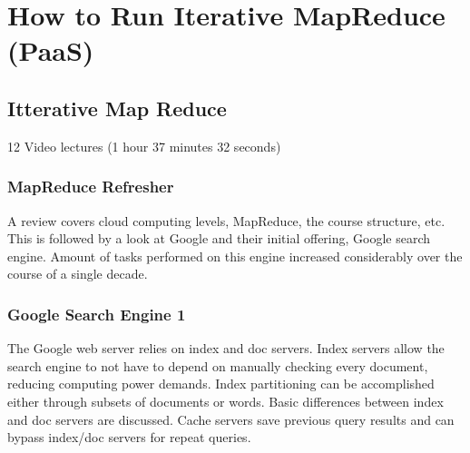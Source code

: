 \part{How to Run Iterative MapReduce (PaaS)}
\label{sec:icloud-iterative-mapreduce}



\chapter{Itterative Map Reduce}

\FILENAME

12 Video lectures (1 hour 37 minutes 32 seconds)

\section{MapReduce Refresher}

A review covers cloud computing levels, MapReduce, the course structure,
etc. This is followed by a look at Google and their initial offering,
Google search engine. Amount of tasks performed on this engine increased
considerably over the course of a single decade.



\section{Google Search Engine 1}

The Google web server relies on index and doc servers. Index servers
allow the search engine to not have to depend on manually checking every
document, reducing computing power demands. Index partitioning can be
accomplished either through subsets of documents or words. Basic
differences between index and doc servers are discussed. Cache servers
save previous query results and can bypass index/doc servers for repeat
queries.




